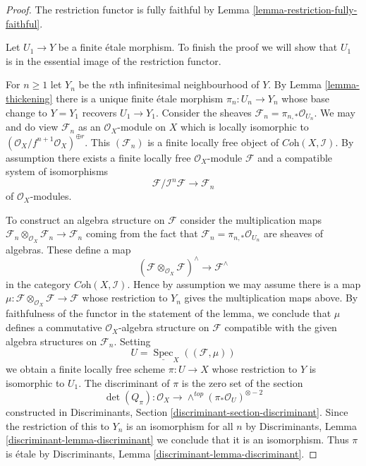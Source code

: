 \documentclass{stacks-project}
\theoremstyle{plain}
\theoremstyle{definition}
\theoremstyle{remark}
\numberwithin{equation}{subsection}
\def\Spec{\mathop{\mathrm{Spec}}}
\begin{document}
\begin{proof}
The restriction functor is fully faithful by
Lemma \ref{lemma-restriction-fully-faithful}.

\medskip\noindent
Let $U_1 \to Y$ be a finite \'etale morphism. To finish the proof
we will show that $U_1$ is in the essential image of the
restriction functor.

\medskip\noindent
For $n \geq 1$ let $Y_n$ be the $n$th infinitesimal neighbourhood of $Y$.
By Lemma \ref{lemma-thickening}
there is a unique finite \'etale morphism
$\pi_n : U_n \to Y_n$ whose base change to $Y = Y_1$
recovers $U_1 \to Y_1$.
Consider the sheaves $\mathcal{F}_n = \pi_{n, *}\mathcal{O}_{U_n}$.
We may and do view $\mathcal{F}_n$ as an $\mathcal{O}_X$-module on $X$
which is locally isomorphic to
$(\mathcal{O}_X/f^{n + 1}\mathcal{O}_X)^{\oplus r}$.
This $(\mathcal{F}_n)$ is a finite locally free object of
$\textit{Coh}(X, \mathcal{I})$.
By assumption there exists a finite locally free $\mathcal{O}_X$-module
$\mathcal{F}$ and a compatible system of isomorphisms
$$
\mathcal{F}/\mathcal{I}^n\mathcal{F} \to \mathcal{F}_n
$$
of $\mathcal{O}_X$-modules.

\medskip\noindent
To construct an algebra structure on $\mathcal{F}$ consider the multiplication
maps
$\mathcal{F}_n \otimes_{\mathcal{O}_X} \mathcal{F}_n \to \mathcal{F}_n$
coming from the fact that $\mathcal{F}_n = \pi_{n, *}\mathcal{O}_{U_n}$
are sheaves of algebras. These define a map
$$
(\mathcal{F}\otimes_{\mathcal{O}_X} \mathcal{F})^\wedge
\longrightarrow
\mathcal{F}^\wedge
$$
in the category $\textit{Coh}(X, \mathcal{I})$. Hence by assumption
we may assume there is a map
$\mu : \mathcal{F}\otimes_{\mathcal{O}_X} \mathcal{F} \to \mathcal{F}$
whose restriction to $Y_n$ gives the multiplication maps above.
By faithfulness of the functor in the statement of the lemma,
we conclude that $\mu$ defines a commutative $\mathcal{O}_X$-algebra
structure on $\mathcal{F}$ compatible with the given algebra
structures on $\mathcal{F}_n$.
Setting
$$
U = \underline{\Spec}_X((\mathcal{F}, \mu))
$$
we obtain a finite locally free scheme $\pi : U \to X$ whose restriction
to $Y$ is isomorphic to $U_1$. The discriminant of $\pi$ is the zero
set of the section
$$
\det(Q_\pi) :
\mathcal{O}_X
\longrightarrow
\wedge^{top}(\pi_*\mathcal{O}_U)^{\otimes -2}
$$
constructed in
Discriminants, Section \ref{discriminant-section-discriminant}.
Since the restriction of this to $Y_n$ is an isomorphism for all $n$
by Discriminants, Lemma \ref{discriminant-lemma-discriminant}
we conclude that it is an isomorphism. Thus $\pi$ is \'etale by
Discriminants, Lemma \ref{discriminant-lemma-discriminant}.
\end{proof}
\end{document}
